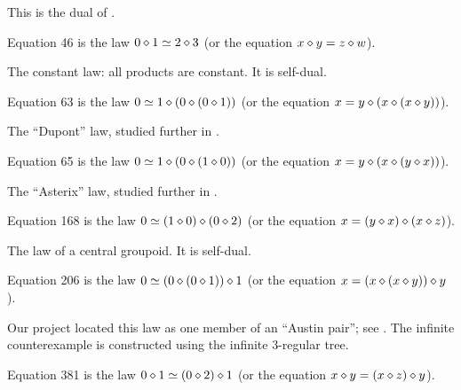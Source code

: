 This is the dual of .

\begin{definition}[Equation 46]\label{eq46}\leanok{}  Equation 46 is the law $0 \diamond 1  \simeq  2 \diamond 3$ (or the equation $x \diamond y = z \diamond w$).
\end{definition}

The constant law: all products are constant. It is self-dual.

\begin{definition}[Equation 63]\label{eq63}\leanok{}  Equation 63 is the law $0 \simeq 1 \diamond (0 \diamond (0 \diamond 1))$ (or the equation $x = y \diamond (x \diamond (x \diamond y))$).
\end{definition}

The ``Dupont'' law, studied further in .

\begin{definition}[Equation 65]\label{eq65}\leanok{}  Equation 65 is the law $0 \simeq 1 \diamond (0 \diamond (1 \diamond 0))$ (or the equation $x = y \diamond (x \diamond (y \diamond x))$).
\end{definition}

The ``Asterix'' law, studied further in .

\begin{definition}[Equation 168]\label{eq168}\leanok{}  Equation 168 is the law $0  \simeq  (1 \diamond 0) \diamond (0 \diamond 2)$ (or the equation $x = (y \diamond x) \diamond (x \diamond z)$).
\end{definition}

The law of a central groupoid. It is self-dual.

\begin{definition}[Equation 206]\label{eq206}\leanok{}  Equation 206 is the law $0  \simeq  (0 \diamond (0 \diamond 1)) \diamond 1$ (or the equation $x = (x \diamond (x \diamond y)) \diamond y$).
\end{definition}

Our project located this law as one member of an ``Austin pair''; see . The infinite counterexample is constructed using the infinite 3-regular tree.

\begin{definition}[Equation 381]\label{eq381}\leanok{}  Equation 381 is the law $0 \diamond 1  \simeq  (0 \diamond 2) \diamond 1$ (or the equation $x \diamond y = (x \diamond z) \diamond y$).
\end{definition}

